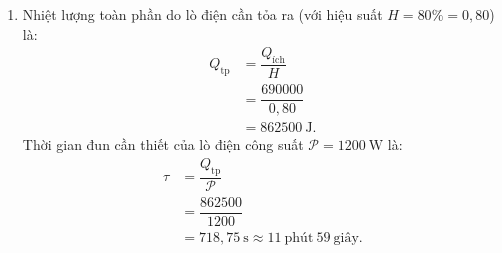 \begin{vidumau}
{\begin{enumerate}
\begin{itemize}
\[\begin{aligned}
                &= 63000\ \mathrm{J}.
        \end{aligned}
        \]
        \item Giai đoạn 2: Làm nóng chảy hoàn toàn khối nước đá ở $0\ ^\circ\mathrm{C}$ thành nước lỏng ở $0\ ^\circ\mathrm{C}$:
        \[
        \begin{aligned}
            Q_2 &= \lambda \cdot m \\
                &= 3{,}34 \cdot 10^5 \cdot 1{,}5 \\
                &= 501000\ \mathrm{J}.
        \end{aligned}
        \]
        \item Giai đoạn 3: Nâng nhiệt độ khối nước lỏng từ $0\ ^\circ\mathrm{C}$ lên $20\ ^\circ\mathrm{C}$:
        \[
        \begin{aligned}
            Q_3 &= m \cdot c_{\text{nước}} \cdot (20 - 0) \\
                &= 1{,}5 \cdot 4200 \cdot 20 \\
                &= 126000\ \mathrm{J}.
        \end{aligned}
        \]
    \end{itemize}
    Tổng nhiệt lượng có ích cần cung cấp cho khối chất là:
    \[
    \begin{aligned}
        Q_{\text{ích}} &= Q_1 + Q_2 + Q_3 \\
                       &= 63000 + 501000 + 126000 \\
                       &= 690000\ \mathrm{J} = 690\ \mathrm{kJ}.
    \end{aligned}
    \]
    \item Nhiệt lượng toàn phần do lò điện cần tỏa ra (với hiệu suất $H = 80\% = 0{,}80$) là:
    \[
    \begin{aligned}
        Q_{\text{tp}} &= \dfrac{Q_{\text{ích}}}{H} \\
                      &= \dfrac{690000}{0{,}80} \\
                      &= 862500\ \mathrm{J}.
    \end{aligned}
    \]
    Thời gian đun cần thiết của lò điện công suất $\mathscr{P} = 1200\ \mathrm{W}$ là:
    \[
    \begin{aligned}
        \tau &= \dfrac{Q_{\text{tp}}}{\mathscr{P}} \\
             &= \dfrac{862500}{1200} \\
             &= 718{,}75\ \mathrm{s} \approx 11\ \text{phút}\ 59\ \text{giây}.
    \end{aligned}
    \]
\end{enumerate}
}
\end{vidumau}

